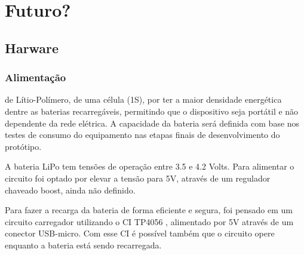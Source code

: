 \documentclass[../monografia.tex]{subfiles}
\begin{document}
\section{Futuro?}
\subsection{Harware}
\subsubsection{Alimentação}
de Lítio-Polímero, de uma célula (1S), por ter a maior densidade energética dentre as baterias recarregáveis, permitindo que o dispositivo seja portátil e não dependente da rede elétrica. A capacidade da bateria será definida com base nos testes de consumo do equipamento nas etapas finais de desenvolvimento do protótipo. 

A bateria LiPo tem tensões de operação entre 3.5 e 4.2 Volts. Para alimentar o circuito foi optado por elevar a tensão para 5V, através de um regulador chaveado boost, ainda não definido. 

Para fazer a recarga da bateria de forma eficiente e segura, foi pensado em um circuito carregador utilizando o CI TP4056 \cite{tp4056}, alimentado por 5V através de um conector USB-micro. Com esse CI é possível também que o circuito opere enquanto a bateria está sendo recarregada. 
\end{document}
